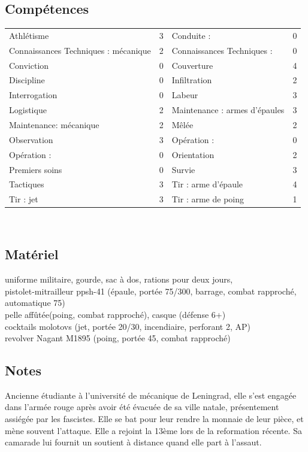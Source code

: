 \documentclass{report}
\begin{document}
\subsection*{Compétences}
\begin{tabular}{p{}| r || p{}| r|}
Athlétisme & 3 &Conduite : & 0\\
Connaissances Techniques : mécanique& 2 &Connaissances Techniques : & 0\\
Conviction & 0 &Couverture& 4\\
Discipline & 0 &Infiltration& 2\\
Interrogation & 0 & Labeur& 3\\
Logistique & 2 & Maintenance : armes d'épaules& 3\\
Maintenance: mécanique & 2& Mêlée& 2\\
Observation & 3 & Opération : & 0\\
Opération : & 0 & Orientation& 2\\
Premiers soins & 0 & Survie& 3\\
Tactiques & 3 & Tir : arme d'épaule& 4\\
Tir : jet & 3 & Tir : arme de poing & 1\\
\end{tabular}\\
\noindent\makebox[\linewidth]{\rule{\textwidth}{0.4pt}}
\subsection*{Matériel}
uniforme militaire, gourde, sac à dos, rations pour deux jours,\\
pistolet-mitrailleur ppsh-41 (épaule, portée 75/300, barrage, combat rapproché, automatique 75) \\
pelle affûtée(poing, combat rapproché), casque (défense 6+)\\
cocktails molotovs (jet, portée 20/30, incendiaire, perforant 2, AP)\\
revolver Nagant M1895 (poing, portée 45, combat rapproché)\\
\noindent\makebox[\linewidth]{\rule{\textwidth}{0.4pt}}

\subsection*{Notes}
Ancienne étudiante à l'université de mécanique de Leningrad, elle s'est engagée dans l'armée rouge après avoir été évacuée de sa ville natale, présentement assiégée par les fascistes. Elle se bat pour leur rendre la monnaie de leur pièce, et mène souvent l'attaque. Elle a rejoint la 13ème lors de la reformation récente. Sa camarade lui fournit un soutient à distance quand elle part à l'assaut.
\end{document}
